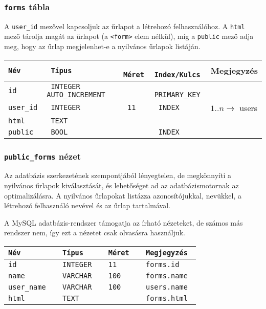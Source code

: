 \documentclass[12pt,a4paper,twoside]{article}
\begin{document}
\subsubsection{\texttt{forms} tábla}

A \texttt{user\_id} mezővel kapcsoljuk az űrlapot a létrehozó felhasználóhoz. A
\texttt{html} mező tárolja magát az űrlapot (a \texttt{<form>} elem nélkül), míg
a \texttt{public} mező adja meg, hogy az űrlap megjelenhet-e a nyilvános űrlapok
listáján.

\small
\vspace{.3cm}
\begin{tabular*}{\textwidth}{>{\tt}l>{\tt}l>{\tt}l>{\tt}l|l}
\rm Név    & \rm Típus &  \rm Méret  & \rm Index/Kulcs & Megjegyzés\\
\hline
 id        & INTEGER AUTO\_INCREMENT && PRIMARY\_KEY   &                            \\
 user\_id  & INTEGER   & 11          & INDEX           & $1..n \rightarrow{}$ users \\
 html      & TEXT      &             &                 &                            \\
 public    & BOOL      &             & INDEX           &                            \\
\end{tabular*}
\normalsize

\subsubsection{\texttt{public\_forms} nézet}

Az adatbázis szerkezetének szempontjából lényegtelen, de megkönnyíti a nyilvános
űrlapok kiválasztását, és lehetőséget ad az adatbázismotornak az
optimalizálásra. A nyilvános űrlapokat listázza azonosítójukkal, nevükkel, a
létrehozó felhasználó nevével és az űrlap tartalmával.

A MySQL adatbázis-rendszer támogatja az írható nézeteket, de számos más rendszer
nem, így ezt a nézetet csak olvasásra használjuk.

\small
\vspace{.3cm}
\begin{tabular*}{\textwidth}{>{\tt}l>{\tt}l>{\tt}l|>{\tt}l}
\rm Név     &  \rm Típus    &  \rm Méret  & Megjegyzés \\
\hline
 id         &  INTEGER      &  11         & forms.id   \\
 name       &  VARCHAR      &  100        & forms.name \\
 user\_name &  VARCHAR      &  100        & users.name \\
 html       &  TEXT         &             & forms.html \\
\end{tabular*}
\normalsize
\end{document}
